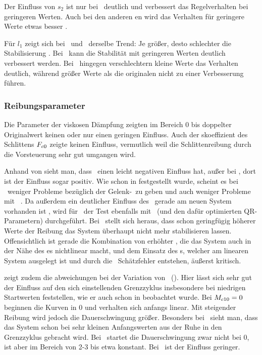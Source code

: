 Der Einfluss von $s_2$ ist nur bei \apd\ deutlich und verbessert das Regelverhalten bei geringeren Werten.
Auch bei den anderen \ap en wird das Verhalten für geringere Werte etwas besser .

Für $l_1$ zeigt sich bei \apz\ und \apd\ derselbe Trend: Je größer, desto schlechter die Stabilisierung .
Bei \apz\ kann die Stabilität mit geringeren Werten deutlich verbessert werden.
Bei \apv\ hingegen verschlechtern kleine Werte das Verhalten deutlich, während größer Werte als die originalen nicht zu einer Verbesserung führen.



\subsubsection{Reibungsparameter}

Die Parameter der viskosen Dämpfung zeigten im Bereich 0 bis doppelter Originalwert keinen oder nur einen geringen Einfluss.
Auch der \crb skoeffizient des Schlittens $F_{c0}$ zeigte keinen Einfluss, vermutlich weil die Schlittenreibung durch die Vorsteuerung sehr gut umgangen wird.

Anhand von  sieht man, dass \Mceo\ einen leicht negativen Einfluss hat, außer bei \apz, dort ist der Einfluss sogar positiv.
Wie schon in  festgestellt wurde, scheint es bei \apz\ weniger Probleme bezüglich der Gelenk-\crb\ zu geben und auch weniger Probleme mit \beob\ .
Da außerdem ein deutlicher Einfluss des \beob\ gerade am neuen System vorhanden ist , wird für \Mceo\ der Test ebenfalls mit \beob\ (und den dafür optimierten QR-Parametern) durchgeführt.
Bei \apv\ stellt sich heraus, dass schon geringfügig höherer Werte der Reibung das System überhaupt nicht mehr stabilisieren lassen.
Offensichtlich ist gerade die Kombination von erhöhter \crb, die das System auch in der Nähe des \ap es nichtlinear macht, und dem Einsatz des \beob s, welcher am linearen System ausgelegt ist und durch die \crb\ Schätzfehler entstehen, äußerst kritisch.

 zeigt zudem die \ap abweichungen bei der Variation von \Mceo\ (\zm).
Hier lässt sich sehr gut der Einfluss auf den sich einstellenden Grenzzyklus insbesondere bei niedrigen Startwerten feststellen, wie er auch schon in  beobachtet wurde.
Bei $M_{c10}=0$ beginnen die Kurven in 0 und verhalten sich anfangs linear.
Mit steigender Reibung wird jedoch die Dauerschwingung größer.
Besonders bei \apv\ sieht man, dass das System schon bei sehr kleinen Anfangswerten aus der Ruhe in den Grenzzyklus gebracht wird.
Bei \apz\ startet die Dauerschwingung zwar nicht bei 0, ist aber im Bereich von 2-3 bis etwa  konstant.
Bei \apd\ ist der Einfluss geringer.

